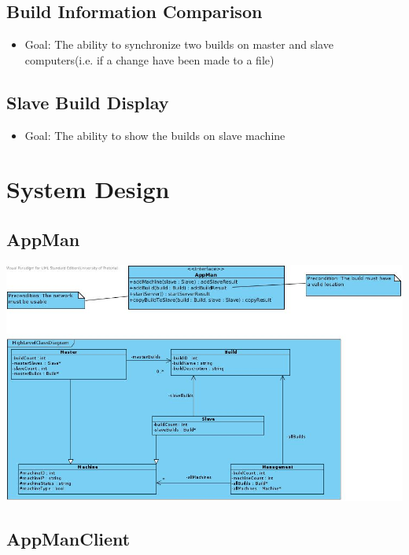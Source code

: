 \documentclass[a4paper,12pt,final]{article}
\begin{document}
\subsection{Build Information Comparison}
\begin{itemize}
\item Goal: The ability to synchronize two builds on master and slave computers(i.e. if a change have been made to a file)
\end{itemize}
\subsection{Slave Build Display}
\begin{itemize}
\item Goal: The ability to show the builds on slave machine
\end{itemize}


\section{System Design}
\subsection{AppMan}

\begin{center}
\includegraphics[scale=0.5]{AppManDiagram.jpg} 
\end{center}

\subsection{AppManClient}
\end{document}
